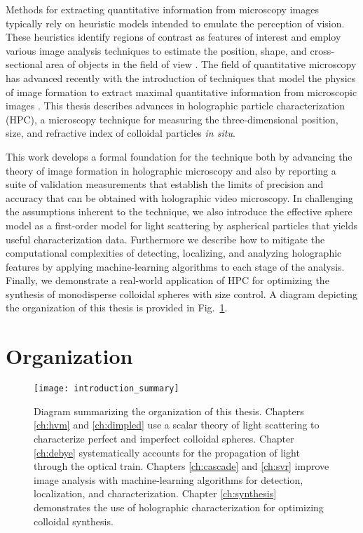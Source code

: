 Methods for extracting quantitative information from microscopy
images typically rely on heuristic models intended to emulate
the perception of vision.
These heuristics identify regions of contrast as features
of interest and employ various image analysis techniques to estimate
the position, shape, and cross-sectional area of objects in the
field of view \cite{jahne97,gonzalez06,castleman96,pratt16,jain89}.
The field of quantitative microscopy has advanced recently with the
introduction of techniques that model the physics of image formation
to extract maximal quantitative information
from microscopic images \cite{lee07,bierbaum2017}.
This thesis describes advances in holographic particle characterization (HPC),
a microscopy technique for measuring
the three-dimensional position, size, and refractive index of
colloidal particles \emph{in situ}.

This work develops a formal foundation for the technique both by
advancing the theory of image formation in holographic microscopy
and also by reporting a suite of validation measurements
that establish the limits of precision and accuracy that can be
obtained with holographic video microscopy. In challenging
the assumptions inherent to the technique, we also introduce the
effective sphere model as a first-order model for
light scattering by aspherical particles that yields useful
characterization data.
Furthermore we describe how to mitigate the computational complexities
of detecting, localizing, and analyzing holographic features by
applying machine-learning algorithms to each stage of the analysis.
Finally, we demonstrate a real-world application
of HPC for optimizing the synthesis of monodisperse
colloidal spheres with size control. A diagram depicting the organization
of this thesis is provided in Fig.~\ref{fig:intro}.



\section{Organization}

\begin{figure}
  \centering
  \texttt{[image: introduction\_summary]}
  \caption{Diagram summarizing the organization of this thesis.
    Chapters \ref{ch:hvm} and \ref{ch:dimpled} use a scalar
    theory of light scattering to characterize perfect and imperfect
    colloidal spheres. Chapter \ref{ch:debye} systematically
    accounts for the propagation of light through the optical
    train. Chapters \ref{ch:cascade} and \ref{ch:svr} improve
    image analysis with machine-learning algorithms for detection, localization,
    and characterization. Chapter \ref{ch:synthesis} demonstrates the use
    of holographic characterization for optimizing colloidal
    synthesis.}
  \label{fig:intro}
\end{figure}

